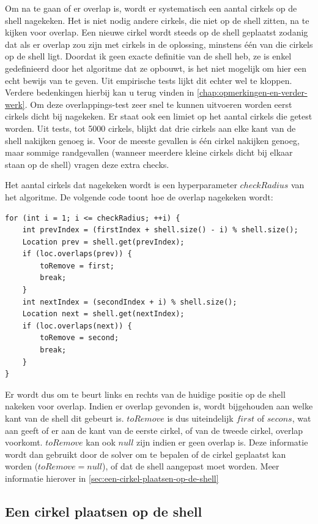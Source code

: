\documentclass[12pt,a4paper,oneside]{book}
\begin{document}
Om na te gaan of er overlap is, wordt er systematisch een aantal cirkels op de shell nagekeken.
Het is niet nodig andere cirkels, die niet op de shell zitten, na te kijken voor overlap.
Een nieuwe cirkel wordt steeds op de shell geplaatst zodanig dat als er overlap zou zijn met cirkels in de oplossing, minstens één van die cirkels op de shell ligt.
Doordat ik geen exacte definitie van de shell heb, ze is enkel gedefinieerd door het algoritme dat ze opbouwt, is het niet mogelijk om hier een echt bewijs van te geven.
Uit empirische tests lijkt dit echter wel te kloppen.
Verdere bedenkingen hierbij kan u terug vinden in \autoref{chap:opmerkingen-en-verder-werk}.
Om deze overlappings-test zeer snel te kunnen uitvoeren worden eerst cirkels dicht bij nagekeken.
Er staat ook een limiet op het aantal cirkels die getest worden.
Uit tests, tot 5000 cirkels, blijkt dat drie cirkels aan elke kant van de shell nakijken genoeg is.
Voor de meeste gevallen is één cirkel nakijken genoeg, maar sommige randgevallen (wanneer meerdere kleine cirkels dicht bij elkaar staan op de shell) vragen deze extra checks.

Het aantal cirkels dat nagekeken wordt is een hyperparameter $checkRadius$ van het algoritme.
De volgende code toont hoe de overlap nagekeken wordt:

\begin{lstlisting}
for (int i = 1; i <= checkRadius; ++i) {
	int prevIndex = (firstIndex + shell.size() - i) % shell.size();
	Location prev = shell.get(prevIndex);
	if (loc.overlaps(prev)) {
		toRemove = first;
		break;
	}
	int nextIndex = (secondIndex + i) % shell.size();
	Location next = shell.get(nextIndex);
	if (loc.overlaps(next)) {
		toRemove = second;
		break;
	}
}
\end{lstlisting}

Er wordt dus om te beurt links en rechts van de huidige positie op de shell nakeken voor overlap.
Indien er overlap gevonden is, wordt bijgehouden aan welke kant van de shell dit gebeurt is.
$toRemove$ is dus uiteindelijk $first$ of $secons$, wat aan geeft of er aan de kant van de eerste cirkel, of van de tweede cirkel, overlap voorkomt.
$toRemove$ kan ook $null$ zijn indien er geen overlap is.
Deze informatie wordt dan gebruikt door de solver om te bepalen of de cirkel geplaatst kan worden ($toRemove = null$), of dat de shell aangepast moet worden.
Meer informatie hierover in \autoref{sec:een-cirkel-plaatsen-op-de-shell}

\subsection{Een cirkel plaatsen op de shell} \label{sec:een-cirkel-plaatsen-op-de-shell}
\end{document}
